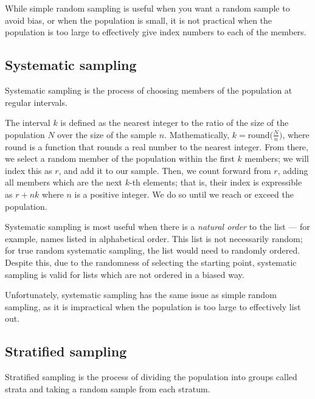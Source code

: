 While simple random sampling is useful when you want a random sample to avoid bias, or when the population is small, it is not practical when the population is too large to effectively give index numbers to each of the members.

\subsection{Systematic sampling}

\begin{tcolorbox}
    \begin{definition}
        Systematic sampling is the process of choosing members of the population at regular intervals.
    \end{definition}
\end{tcolorbox}

The interval $k$ is defined as the nearest integer to the ratio of the size of the population $N$ over the size of the sample $n$. Mathematically, $k = \mathrm{round}\big(\frac{N}{n}\big)$, where $\mathrm{round}$ is a function that rounds a real number to the nearest integer. From there, we select a random member of the population within the first $k$ members; we will index this as $r$, and add it to our sample. Then, we count forward from $r$, adding all members which are the next $k$-th elements; that is, their index is expressible as $r+nk$ where $n$ is a positive integer. We do so until we reach or exceed the population.

Systematic sampling is most useful when there is a \textit{natural order} to the list — for example, names listed in alphabetical order. This list is not necessarily random; for true random systematic sampling, the list would need to randomly ordered. Despite this, due to the randomness of selecting the starting point, systematic sampling is valid for lists which are not ordered in a biased way.

Unfortunately, systematic sampling has the same issue as simple random sampling, as it is impractical when the population is too large to effectively list out.

\subsection{Stratified sampling}

\begin{tcolorbox}
    \begin{definition}
        Stratified sampling is the process of dividing the population into groups called strata and taking a random sample from each stratum.
    \end{definition}
\end{tcolorbox}

